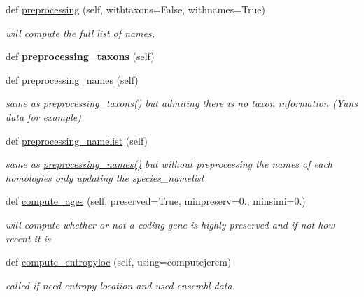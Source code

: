\begin{DoxyCompactItemize}
def \mbox{\hyperlink{class_py_c_u_b_1_1homoset_1_1_homo_set_a3f689e03251e7b4fe262a86d08946998}{preprocessing}} (self, withtaxons=False, withnames=True)
\begin{DoxyCompactList}\small\item\em will compute the full list of names, \end{DoxyCompactList}\item 
\mbox{\label{class_py_c_u_b_1_1homoset_1_1_homo_set_aa39455620288b4912e5540491913e792}} 
def {\bfseries preprocessing\+\_\+taxons} (self)
\item 
def \mbox{\hyperlink{class_py_c_u_b_1_1homoset_1_1_homo_set_a36cf71a7bc24b788c4d526591a8ec376}{preprocessing\+\_\+names}} (self)
\begin{DoxyCompactList}\small\item\em same as preprocessing\+\_\+taxons() but admiting there is no taxon information (Yun\textquotesingle{}s data for example) \end{DoxyCompactList}\item 
def \mbox{\hyperlink{class_py_c_u_b_1_1homoset_1_1_homo_set_a4060c440127aa861c17b6157c81e2d27}{preprocessing\+\_\+namelist}} (self)
\begin{DoxyCompactList}\small\item\em same as \mbox{\hyperlink{class_py_c_u_b_1_1homoset_1_1_homo_set_a36cf71a7bc24b788c4d526591a8ec376}{preprocessing\+\_\+names()}} but without preprocessing the names of each homologies only updating the species\+\_\+namelist \end{DoxyCompactList}\item 
def \mbox{\hyperlink{class_py_c_u_b_1_1homoset_1_1_homo_set_a59a0c4c70f6dbd2dd156e2b2c9b00421}{compute\+\_\+ages}} (self, preserved=True, minpreserv=0., minsimi=0.)
\begin{DoxyCompactList}\small\item\em will compute whether or not a coding gene is highly preserved and if not how recent it is \end{DoxyCompactList}\item 
def \mbox{\hyperlink{class_py_c_u_b_1_1homoset_1_1_homo_set_a78ab39ddfa288661f5e809ea0a455187}{compute\+\_\+entropyloc}} (self, using=\textquotesingle{}computejerem\textquotesingle{})
\begin{DoxyCompactList}\small\item\em called if need entropy location and used ensembl data. \end{DoxyCompactList}\item 

\end{DoxyCompactItemize}
